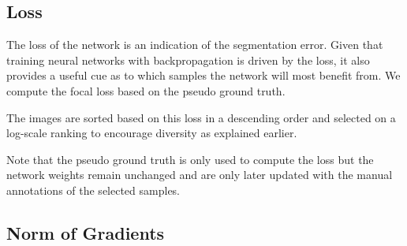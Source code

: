 \documentclass[letterpaper, 10 pt, conference]{ieeeconf}  %
\begin{document}
\subsection{Loss} \label{sec:loss}

The loss of the network is an indication of the segmentation error. Given that training neural networks with backpropagation is driven by the loss, it also provides a useful cue as to which samples the network will most benefit from. We compute the focal loss \cite{DBLP:conf/iccv/LinGGHD17} based on the pseudo ground truth.

The images are sorted based on this loss in a descending order and selected on a log-scale ranking to encourage diversity as explained earlier.




%

Note that the pseudo ground truth is only used to compute the loss but the network weights remain unchanged and are only later updated with the manual annotations of the selected samples.


\subsection{Norm of Gradients} \label{sec:grad_norm}
\end{document}
